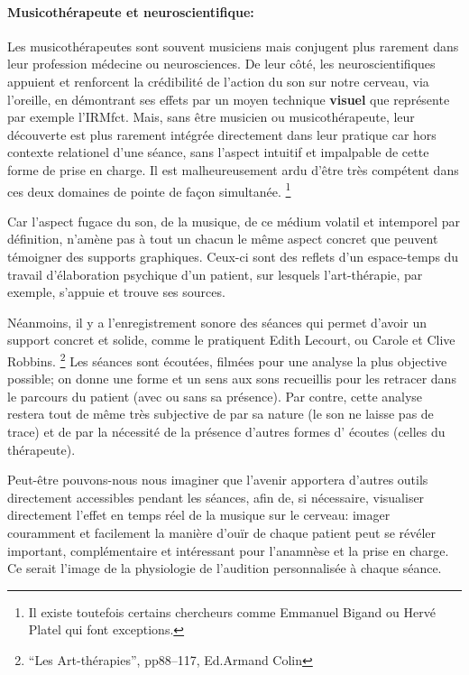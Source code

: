 

 
\paragraph{Musicothérapeute et neuroscientifique: }

 
Les musicothérapeutes sont souvent musiciens mais conjugent plus
rarement dans leur profession
médecine ou neurosciences. De leur côté, les neuroscientifiques appuient
et renforcent la crédibilité de l'action du son sur notre cerveau, via
l'oreille, en démontrant ses effets par un moyen technique
\textbf{visuel} que représente par exemple l'IRMfct. Mais, sans être musicien ou
musicothérapeute, leur découverte est plus rarement intégrée
directement dans leur pratique car hors contexte relationel d'une
séance, sans l'aspect intuitif et impalpable de cette forme de prise
en charge.
Il est malheureusement ardu d'être très compétent dans ces deux domaines
de pointe de façon simultanée.   \footnote  {Il existe toutefois certains chercheurs
comme Emmanuel Bigand ou Hervé Platel qui font exceptions.}

Car l'aspect fugace du son, de la musique, de ce médium volatil et
intemporel par
définition, n'amène pas à tout un chacun le
même aspect concret que peuvent témoigner des supports
graphiques. Ceux-ci sont des 
reflets d'un espace-temps du travail d'élaboration
psychique d'un patient, sur lesquels l'art-thérapie, par exemple, s'appuie et trouve
ses sources.


Néanmoins, il y a l'enregistrement sonore des séances qui 
permet d'avoir un support concret et solide, comme le pratiquent Edith Lecourt, ou Carole et Clive 
Robbins. \footnote{``Les Art-thérapies'', pp88--117, Ed.Armand Colin}
Les séances sont écoutées, filmées pour une
analyse la plus objective possible; on donne 
une forme et un sens aux sons recueillis pour les retracer dans le
parcours du patient (avec ou sans sa présence). Par contre, cette analyse  restera
tout de même très subjective de par sa nature (le son ne laisse pas
de trace) et de par la nécessité de la présence d'autres formes d'
écoutes (celles du thérapeute).

Peut-être pouvons-nous nous imaginer que l'avenir apportera d'autres outils
directement accessibles pendant les séances, afin
 de, si nécessaire, visualiser directement l'effet en temps réel de la musique sur le
 cerveau:  imager couramment et facilement la manière d'ouïr de chaque
 patient peut se révéler important, complémentaire et intéressant pour l'anamnèse et la prise en charge.
 Ce serait l'image de la
 physiologie de l'audition personnalisée à chaque séance.

